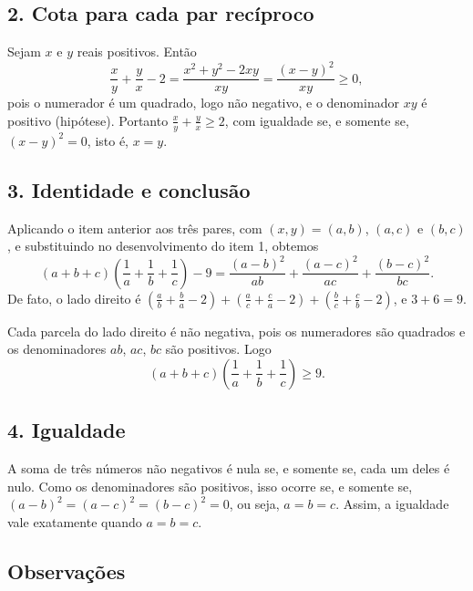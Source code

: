 \documentclass{article}%
\begin{document}
\subsection*{2. Cota para cada par recíproco}

Sejam $x$ e $y$ reais positivos. Então
\[
\frac{x}{y}+\frac{y}{x}-2=\frac{x^2+y^2-2xy}{xy}=\frac{(x-y)^2}{xy}\geq 0,
\]
pois o numerador é um quadrado, logo não negativo, e o denominador $xy$ é positivo (hipótese). Portanto $\frac{x}{y}+\frac{y}{x}\geq 2$, com igualdade se, e somente se, $(x-y)^2=0$, isto é, $x=y$.

\subsection*{3. Identidade e conclusão}

Aplicando o item anterior aos três pares, com $(x,y)=(a,b)$, $(a,c)$ e $(b,c)$, e substituindo no desenvolvimento do item 1, obtemos
\[
(a+b+c)\left(\frac{1}{a}+\frac{1}{b}+\frac{1}{c}\right)-9
=\frac{(a-b)^2}{ab}+\frac{(a-c)^2}{ac}+\frac{(b-c)^2}{bc}.
\]
De fato, o lado direito é $\left(\frac{a}{b}+\frac{b}{a}-2\right)+\left(\frac{a}{c}+\frac{c}{a}-2\right)+\left(\frac{b}{c}+\frac{c}{b}-2\right)$, e $3+6=9$.

Cada parcela do lado direito é não negativa, pois os numeradores são quadrados e os denominadores $ab$, $ac$, $bc$ são positivos. Logo
\[
(a+b+c)\left(\frac{1}{a}+\frac{1}{b}+\frac{1}{c}\right)\geq 9.
\]

\subsection*{4. Igualdade}

A soma de três números não negativos é nula se, e somente se, cada um deles é nulo. Como os denominadores são positivos, isso ocorre se, e somente se, $(a-b)^2=(a-c)^2=(b-c)^2=0$, ou seja, $a=b=c$. Assim, a igualdade vale exatamente quando $a=b=c$.

\subsection*{Observações}
\end{document}
